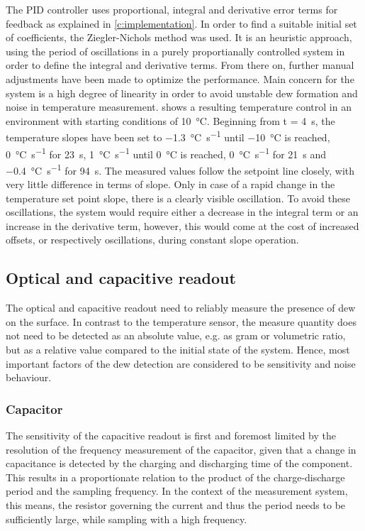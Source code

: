 The \gls{PID} controller uses proportional, integral and derivative error terms for feedback as explained in \cref{c:implementation}. In order to find a suitable initial set of coefficients, the Ziegler-Nichols method was used. It is an heuristic approach, using the period of oscillations in a purely proportianally controlled system in order to define the integral and derivative terms. From there on, further manual adjustments have been made to optimize the performance. Main concern for the system is a high degree of linearity in order to avoid unstable dew formation and noise in temperature measurement.  shows a resulting temperature control in an environment with starting conditions of \qty{10}{\celsius}. Beginning from t = \qty{4}{\s}, the temperature slopes have been set to \qty[per-mode=fraction]{-1.3}{\celsius\per\s} until \qty{-10}{\celsius} is reached, \qty[per-mode=fraction]{0}{\celsius\per\s} for \qty{23}{\s}, \qty[per-mode=fraction, retain-explicit-plus]{+1}{\celsius\per\s} until \qty{0}{\celsius} is reached, \qty[per-mode=fraction]{0}{\celsius\per\s} for \qty{21}{\s} and \qty[per-mode=fraction]{-0.4}{\celsius\per\s} for \qty{94}{\s}. The measured values follow the setpoint line closely, with very little difference in terms of slope. Only in case of a rapid change in the temperature set point slope, there is a clearly visible oscillation. To avoid these oscillations, the system would require either a decrease in the integral term or an increase in the derivative term, however, this would come at the cost of increased offsets, or respectively oscillations, during constant slope operation.


\subsection{Optical and capacitive readout}
The optical and capacitive readout need to reliably measure the presence of dew on the surface. In contrast to the temperature sensor, the measure quantity does not need to be detected as an absolute value, e.g. as gram or volumetric ratio, but as a relative value compared to the initial state of the system. Hence, most important factors of the dew detection are considered to be sensitivity and noise behaviour.

\subsubsection{Capacitor}
The sensitivity of the capacitive readout is first and foremost limited by the resolution of the frequency measurement of the capacitor, given that a change in capacitance is detected by the charging and discharging time of the component. This results in a proportionate relation to the product of the charge-discharge period and the sampling frequency. In the context of the measurement system, this means, the resistor governing the current and thus the period needs to be sufficiently large, while sampling with a high frequency. 

